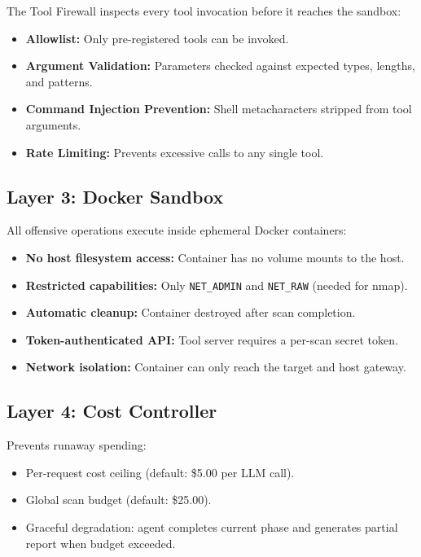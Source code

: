 \documentclass[12pt,a4paper,twoside]{report}
\begin{document}
The Tool Firewall inspects every tool invocation before it reaches the sandbox:
\begin{itemize}
    \item \textbf{Allowlist:} Only pre-registered tools can be invoked.
    \item \textbf{Argument Validation:} Parameters checked against expected types, lengths, and patterns.
    \item \textbf{Command Injection Prevention:} Shell metacharacters stripped from tool arguments.
    \item \textbf{Rate Limiting:} Prevents excessive calls to any single tool.
\end{itemize}

\subsection{Layer 3: Docker Sandbox}

All offensive operations execute inside ephemeral Docker containers:
\begin{itemize}
    \item \textbf{No host filesystem access:} Container has no volume mounts to the host.
    \item \textbf{Restricted capabilities:} Only \texttt{NET\_ADMIN} and \texttt{NET\_RAW} (needed for nmap).
    \item \textbf{Automatic cleanup:} Container destroyed after scan completion.
    \item \textbf{Token-authenticated API:} Tool server requires a per-scan secret token.
    \item \textbf{Network isolation:} Container can only reach the target and host gateway.
\end{itemize}

\subsection{Layer 4: Cost Controller}

Prevents runaway spending:
\begin{itemize}
    \item Per-request cost ceiling (default: \$5.00 per LLM call).
    \item Global scan budget (default: \$25.00).
    \item Graceful degradation: agent completes current phase and generates partial report when budget exceeded.
\end{itemize}
\end{document}
